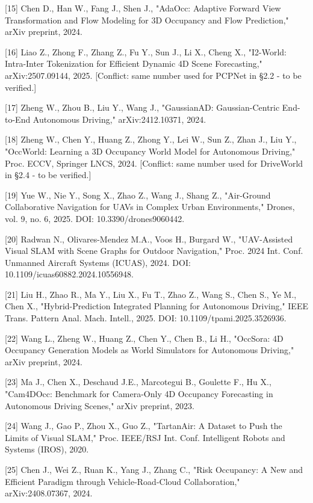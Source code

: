 \documentclass[
]{article}
\begin{document}
{[}15{]} Chen D., Han W., Fang J., Shen J., "AdaOcc: Adaptive Forward
View Transformation and Flow Modeling for 3D Occupancy and Flow
Prediction," arXiv preprint, 2024.

{[}16{]} Liao Z., Zhong F., Zhang Z., Fu Y., Sun J., Li X., Cheng X.,
"I2-World: Intra-Inter Tokenization for Efficient Dynamic 4D Scene
Forecasting," arXiv:2507.09144, 2025. {[}Conflict: same number used for
PCPNet in §2.2 - to be verified.{]}

{[}17{]} Zheng W., Zhou B., Liu Y., Wang J., "GaussianAD:
Gaussian-Centric End-to-End Autonomous Driving," arXiv:2412.10371, 2024.

{[}18{]} Zheng W., Chen Y., Huang Z., Zhong Y., Lei W., Sun Z., Zhan J.,
Liu Y., "OccWorld: Learning a 3D Occupancy World Model for Autonomous
Driving," Proc. ECCV, Springer LNCS, 2024. {[}Conflict: same number used
for DriveWorld in §2.4 - to be verified.{]}

{[}19{]} Yue W., Nie Y., Song X., Zhao Z., Wang J., Shang Z.,
"Air-Ground Collaborative Navigation for UAVs in Complex Urban
Environments," Drones, vol. 9, no. 6, 2025. DOI: 10.3390/drones9060442.

{[}20{]} Radwan N., Olivares-Mendez M.A., Voos H., Burgard W.,
"UAV-Assisted Visual SLAM with Scene Graphs for Outdoor Navigation,"
Proc. 2024 Int. Conf. Unmanned Aircraft Systems (ICUAS), 2024. DOI:
10.1109/icuas60882.2024.10556948.

{[}21{]} Liu H., Zhao R., Ma Y., Liu X., Fu T., Zhao Z., Wang S., Chen
S., Ye M., Chen X., "Hybrid-Prediction Integrated Planning for
Autonomous Driving," IEEE Trans. Pattern Anal. Mach. Intell., 2025. DOI:
10.1109/tpami.2025.3526936.

{[}22{]} Wang L., Zheng W., Huang Z., Chen Y., Chen B., Li H., "OccSora:
4D Occupancy Generation Models as World Simulators for Autonomous
Driving," arXiv preprint, 2024.

{[}23{]} Ma J., Chen X., Deschaud J.E., Marcotegui B., Goulette F., Hu
X., "Cam4DOcc: Benchmark for Camera-Only 4D Occupancy Forecasting in
Autonomous Driving Scenes," arXiv preprint, 2023.

{[}24{]} Wang J., Gao P., Zhou X., Guo Z., "TartanAir: A Dataset to Push
the Limits of Visual SLAM," Proc. IEEE/RSJ Int. Conf. Intelligent Robots
and Systems (IROS), 2020.

{[}25{]} Chen J., Wei Z., Ruan K., Yang J., Zhang C., "Risk Occupancy: A
New and Efficient Paradigm through Vehicle-Road-Cloud Collaboration,"
arXiv:2408.07367, 2024.
\end{document}
